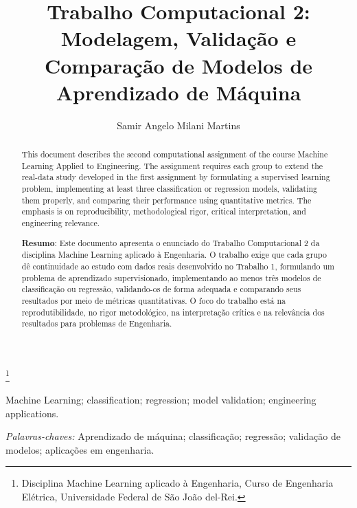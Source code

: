 \documentclass[a4paper]{ifacconf}
\begin{document}

\begin{frontmatter}

\title{Trabalho Computacional 2: Modelagem, Validação e Comparação de Modelos de Aprendizado de Máquina}

\thanks[footnoteinfo]{Disciplina Machine Learning aplicado à Engenharia, Curso de Engenharia Elétrica, Universidade Federal de São João del-Rei.}

\author[First]{Samir Angelo Milani Martins}

\address[First]{Departamento de Engenharia Elétrica, Universidade Federal de São João del-Rei, MG (e-mail: martins@ufsj.edu.br).}

\renewcommand{\abstractname}{{\bf Abstract:~}}
\begin{abstract}
This document describes the second computational assignment of the course Machine Learning Applied to Engineering. The assignment requires each group to extend the real-data study developed in the first assignment by formulating a supervised learning problem, implementing at least three classification or regression models, validating them properly, and comparing their performance using quantitative metrics. The emphasis is on reproducibility, methodological rigor, critical interpretation, and engineering relevance.

\vskip 1mm
{\noindent \bf Resumo}: Este documento apresenta o enunciado do Trabalho Computacional 2 da disciplina Machine Learning aplicado à Engenharia. O trabalho exige que cada grupo dê continuidade ao estudo com dados reais desenvolvido no Trabalho 1, formulando um problema de aprendizado supervisionado, implementando ao menos três modelos de classificação ou regressão, validando-os de forma adequada e comparando seus resultados por meio de métricas quantitativas. O foco do trabalho está na reprodutibilidade, no rigor metodológico, na interpretação crítica e na relevância dos resultados para problemas de Engenharia.
\end{abstract}

\begin{keyword}
Machine Learning; classification; regression; model validation; engineering applications.

\vskip 1mm
{\noindent\it Palavras-chaves:} Aprendizado de máquina; classificação; regressão; validação de modelos; aplicações em engenharia.
\end{keyword}

\end{frontmatter}
\end{document}
